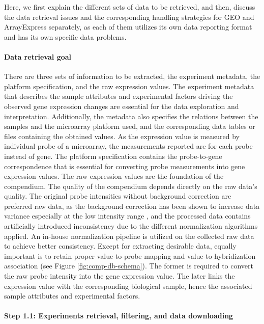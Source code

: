 Here, we first explain the different sets of data to be retrieved, and then, discuss the data retrieval issues and the corresponding handling strategies for GEO and ArrayExpress separately, as each of them utilizes its own data reporting format and has its own specific data problems.


\paragraph{Data retrieval goal}\label{sec:command-data-goal}

There are three sets of information to be extracted, the experiment metadata, the platform specification, and the raw expression values. The experiment metadata that describes the sample attributes and experimental factors driving the observed gene expression changes are essential for the data exploration and interpretation. Additionally, the metadata also specifies the relations between the samples and the microarray platform used, and the corresponding data tables or files containing the obtained values. As the expression value is measured by individual probe of a microarray, the measurements reported are for each probe instead of gene. The platform specification contains the probe-to-gene correspondence that is essential for converting probe measurements into gene expression values. The raw expression values are the foundation of the compendium.  The quality of the compendium depends directly on the raw data's quality. The original probe intensities without background correction are preferred raw data, as the background correction has been shown to increase data variance especially at the low intensity range \cite{Irizarry2006, Ritchie2007}, and the processed data contains artificially introduced inconsistency due to the different normalization algorithms applied. An in-house normalization pipeline is utilized on the collected raw data to achieve better consistency. Except for extracting desirable data, equally important is to retain proper value-to-probe mapping and value-to-hybridization association (see Figure \ref{fig:comp-db-schema}). The former is required to convert the raw probe intensity into the gene expression value. The later links the expression value with the corresponding biological sample, hence the associated sample attributes and experimental factors.


\paragraph{Step 1.1: Experiments retrieval, filtering, and data downloading}

